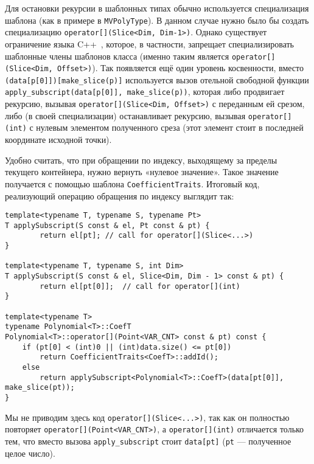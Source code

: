 \documentclass[14pt]{extarticle}
\begin{document}
Для остановки рекурсии в шаблонных типах обычно используется специализация
шаблона (как в примере в \lstinline$MVPolyType$). В данном случае нужно было бы 
создать специализацию \lstinline$operator[](Slice<Dim, Dim-1>)$. Однако
существует ограничение языка C++~\cite[п. 12.3.3]{VJ03}, которое, в частности,
запрещает специализировать шаблонные члены шаблонов класса (именно таким является
\lstinline$operator[](Slice<Dim, Offset>)$). Так появляется ещё один уровень
косвенности, вместо \lstinline$(data[p[0]])[make_slice(p)]$ используется вызов
отельной свободной функции
\lstinline$apply_subscript(data[p[0]], make_slice(p))$, которая либо продвигает
рекурсию, вызывая \lstinline$operator[](Slice<Dim, Offset>)$ с переданным ей
срезом, либо (в своей специализации) останавливает рекурсию, вызывая 
\lstinline$operator[](int)$ с нулевым элементом полученного среза (этот элемент
стоит в последней координате исходной точки).

Удобно считать, что при обращении по индексу, выходящему за пределы
текущего контейнера, нужно вернуть «нулевое значение». Такое значение получается
с помощью шаблона \lstinline$CoefficientTraits$. Итоговый код, реализующий
операцию обращения по индексу выглядит так:
\begin{lstlisting}
template<typename T, typename S, typename Pt>
T applySubscript(S const & el, Pt const & pt) {
        return el[pt]; // call for operator[](Slice<...>)
}

template<typename T, typename S, int Dim>
T applySubscript(S const & el, Slice<Dim, Dim - 1> const & pt) {
        return el[pt[0]];  // call for operator[](int)
}

template<typename T>
typename Polynomial<T>::CoefT
Polynomial<T>::operator[](Point<VAR_CNT> const & pt) const {
    if (pt[0] < (int)0 || (int)data.size() <= pt[0])
        return CoefficientTraits<CoefT>::addId();
    else
        return applySubscript<Polynomial<T>::CoefT>(data[pt[0]], make_slice(pt));
}
\end{lstlisting}
Мы не приводим здесь код \lstinline$operator[](Slice<...>)$, так как он
полностью повторяет \lstinline$operator[](Point<VAR_CNT>)$, а
\lstinline$operator[](int)$ отличается только тем, что вместо вызова
\lstinline$apply_subscript$ стоит \lstinline$data[pt]$ (\lstinline$pt$ —
полученное целое число).
\end{document}
